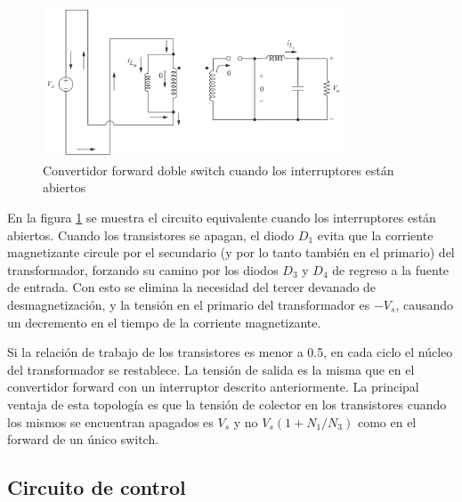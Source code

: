 \begin{figure}[H]
    \centering
    \includegraphics[width=0.8\textwidth]{images/hart/forward_doble_switch_open.png}
    \caption{Convertidor forward doble switch cuando los interruptores están abiertos}
    \label{fig:forward_doble_switch_open}
\end{figure}

En la figura \ref{fig:forward_doble_switch_open} se muestra el circuito equivalente cuando los interruptores están abiertos.  
Cuando los transistores se apagan, el diodo $D_1$ evita que la corriente magnetizante circule por el secundario 
(y por lo tanto también en el primario) del transformador, forzando su camino por los diodos $D_3$ y $D_4$ de regreso a la fuente de entrada.  
Con esto se elimina la necesidad del tercer devanado de desmagnetización, y la tensión en el primario del transformador es $-V_s$, causando un decremento en el tiempo de la corriente magnetizante. 

Si la relación de trabajo de los transistores es menor a 0.5, en cada ciclo el núcleo del transformador se restablece.
La tensión de salida es la misma que en el convertidor forward con un interruptor descrito anteriormente.
La principal ventaja de esta topología es que la tensión de colector en los transistores cuando los mismos se encuentran apagados 
es $V_s$ y no $V_s\left(1+N_1/N_3\right)$ como en el forward de un único switch.

\subsection{Circuito de control}


